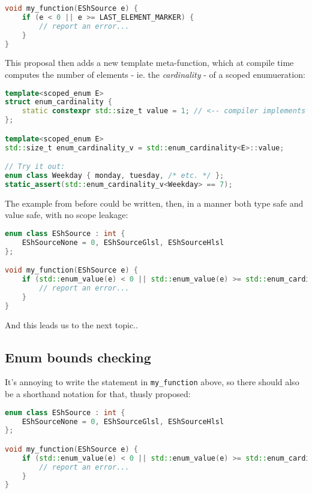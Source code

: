 \documentclass[
  format=manuscript,
  screen=true,
  review=false,
  nonacm=true,
  timestamp=true,
  balance=false]{acmart}
\begin{document}
\begin{lstlisting}[language=Cpp]
void my_function(EShSource e) {
    if (e < 0 || e >= LAST_ELEMENT_MARKER) {
        // report an error...
    }
}
\end{lstlisting}


\noindent
This proposal then adds a new template meta-function, which at compile time computes
the number of elements - ie. the \textit{cardinality} - of a scoped enumueration:\vspace{2mm}

\begin{lstlisting}[language=Cpp]
template<scoped_enum E>
struct enum_cardinality {
    static constexpr std::size_t value = 1; // <-- compiler implements this
};

template<scoped_enum E>
std::size_t enum_cardinality_v = std::enum_cardinality<E>::value;

// Try it out:
enum class Weekday { monday, tuesday, /* etc. */ };
static_assert(std::enum_cardinality_v<Weekday> == 7);
\end{lstlisting}

\noindent
The example from before could be written, then, in a manner both type safe and
value safe, with no scope leakage:\vspace{2mm}

\begin{lstlisting}[language=Cpp]
enum class EShSource : int {
    EShSourceNone = 0, EShSourceGlsl, EShSourceHlsl
};

void my_function(EShSource e) {
    if (std::enum_value(e) < 0 || std::enum_value(e) >= std::enum_cardinality_v<EShSource>) {
        // report an error...
    }
}
\end{lstlisting}

And this leads us to the next topic..


\subsection{Enum bounds checking}

It's annoying to write the statement in \texttt{my\_function} above, so there
should also be a shorthand notation for that, thusly proposed:\vspace{2mm}

\begin{lstlisting}[language=Cpp]
enum class EShSource : int {
    EShSourceNone = 0, EShSourceGlsl, EShSourceHlsl
};

void my_function(EShSource e) {
    if (std::enum_value(e) < 0 || std::enum_value(e) >= std::enum_cardinality_v<EShSource>) {
        // report an error...
    }
}
\end{lstlisting}
\end{document}

